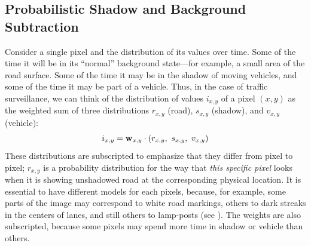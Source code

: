 \subsection{Probabilistic Shadow and Background Subtraction}
\label{shadow-and-background-subtraction-section}
\label{pixel-model-section}


Consider a single pixel and the distribution of its values over time.
Some of the time it will be in its ``normal'' background state---for
example, a small area of the road surface. Some of the time it may be
in the shadow of moving vehicles, and some of the time it may be part
of a vehicle. Thus, in the case of traffic surveillance, we can think
of the distribution of values $i_{x,y}$ of a pixel $(x,y)$ as the
weighted sum of three distributions $r_{x,y}$ (road), $s_{x,y}$
(shadow), and $v_{x,y}$ (vehicle):
\[ i_{x,y} = \mbox{{\bf w}}_{x,y} \cdot (r_{x,y},\ s_{x,y},\ v_{x,y}) \]
These distributions are subscripted
to emphasize that they differ from pixel to pixel; $r_{x,y}$ is a
probability distribution for the way that {\em this specific pixel}
looks when it is showing unshadowed road at the corresponding physical
location. It is essential to have different models for each pixels,
because, for example, some parts of the image may correspond to white road
markings, others to dark streaks in the centers of lanes, and still
others to lamp-posts (see ).
The weights are also subscripted, because some pixels
may spend more time in shadow or vehicle than others.

